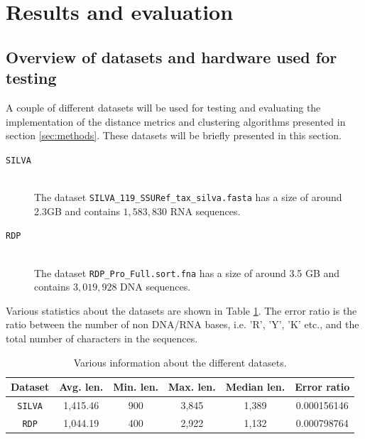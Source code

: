\section{Results and evaluation} \label{sec:results}

\subsection{Overview of datasets and hardware used for testing}
\label{sec:overview_of_datasets}

A couple of different datasets will be used for testing and evaluating the
implementation of the distance metrics and clustering algorithms presented in
section \ref{sec:methods}. These datasets will be briefly presented in this
section.

\begin{description}
  \item[\texttt{SILVA}] \hfill \\
    The dataset \texttt{SILVA\_119\_SSURef\_tax\_silva.fasta} has a size of
    around 2.3GB and contains $1,583,830$ RNA sequences.

  \item[\texttt{RDP}] \hfill \\
    The dataset \texttt{RDP\_Pro\_Full.sort.fna} has a size of around 3.5 GB
    and contains $3,019,928$ DNA sequences.
\end{description}

Various statistics about the datasets are shown in Table \ref{tab:data_stats}.
The error ratio is the ratio between the number of non DNA/RNA bases, i.e. 'R',
'Y', 'K' etc., and the total number of characters in the sequences.

\begin{table}[H]
  \centering
  \begin{tabular}{c |  c | c | c | c | c}
    Dataset        & Avg. len. & Min. len. & Max. len. & Median len. & Error ratio \\
    \hline
    \texttt{SILVA} & 1,415.46  & 900       & 3,845     & 1,389       & 0.000156146 \\
    \texttt{RDP}   & 1,044.19  & 400       & 2,922     & 1,132       & 0.000798764 \\
  \end{tabular}
  \caption{Various information about the different datasets.}
  \label{tab:data_stats}
\end{table}

